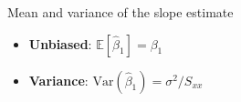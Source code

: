 \begin{frame}{Mean and variance of the slope estimate}
    \begin{itemize}
        \item \textbf{Unbiased}: $\mathbb{E}[\hat\beta_1] = \beta_1$
        \item \textbf{Variance}: $\mathrm{Var}(\hat\beta_1) = \sigma^2 / S_{xx}$
    \end{itemize}
\end{frame}




